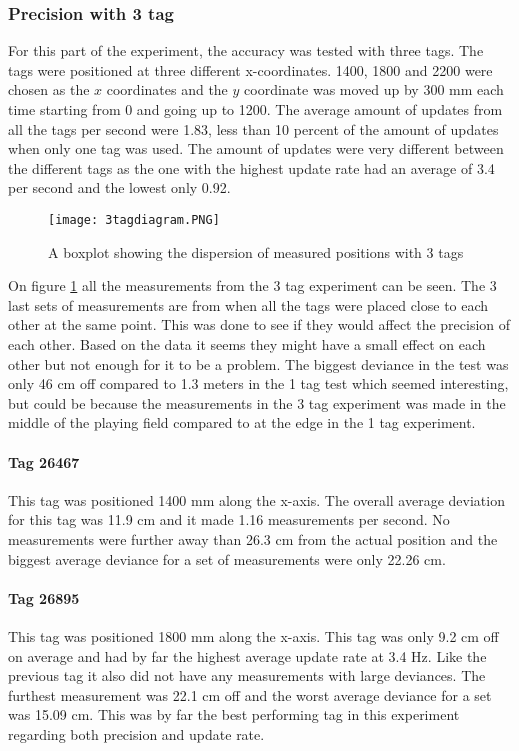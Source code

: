 \subsubsection{Precision with 3 tag}
For this part of the experiment, the accuracy was tested with three tags. 
The tags were positioned at three different x-coordinates. 
1400, 1800 and 2200 were chosen as the $x$ coordinates and the $y$ coordinate was moved up by 300 mm each time starting from 0 and going up to 1200.
The average amount of updates from all the tags per second were 1.83, less than 10 percent of the amount of updates when only one tag was used.
The amount of updates were very different between the different tags as the one with the highest update rate had an average of 3.4 per second and the lowest only 0.92.
\begin{figure}[H]
    \centering
    \texttt{[image: 3tagdiagram.PNG]}
    \caption{A boxplot showing the dispersion of measured positions with 3 tags}
    \label{fig:3tagdiagram}
\end{figure}
\noindent
On figure \ref{fig:3tagdiagram} all the measurements from the 3 tag experiment can be seen.
The 3 last sets of measurements are from when all the tags were placed close to each other at the same point.
This was done to see if they would affect the precision of each other.
Based on the data it seems they might have a small effect on each other but not enough for it to be a problem.
The biggest deviance in the test was only 46 cm off compared to 1.3 meters in the 1 tag test which seemed interesting, but could be because the measurements in the 3 tag experiment was made in the middle of the playing field compared to at the edge in the 1 tag experiment.

\paragraph{Tag 26467}
This tag was positioned 1400 mm along the x-axis.
The overall average deviation for this tag was 11.9 cm and it made 1.16 measurements per second.
No measurements were further away than 26.3 cm from the actual position and the biggest average deviance for a set of measurements were only 22.26 cm.


\paragraph{Tag 26895}
This tag was positioned 1800 mm along the x-axis.
This tag was only 9.2 cm off on average and had by far the highest average update rate at 3.4 Hz.
Like the previous tag it also did not have any measurements with large deviances.
The furthest measurement was 22.1 cm off and the worst average deviance for a set was 15.09 cm.
This was by far the best performing tag in this experiment regarding both precision and update rate.

